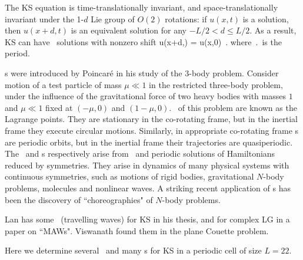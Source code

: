 \renewcommand{\inputfile}{\version\ - edited 2007-03-11 rpoHistory}


The KS equation   is time-translationally invariant,
and
space-translationally invariant
under the 1-$d$ Lie group of $O(2)$ rotations: if
$u(x,t)$ is a solution, then $u(x+d,t)$ is an equivalent
solution for any $-L/2 < d \leq L/2$.
As a result,
KS can have \rpo\ solutions with nonzero shift
\beq
u(x+d,\period{}) = u(x,0)
\,.
where $\period{}$ is the period.


{\Rpo s} were introduced by Poincar\'e in his study of
the 3-body problem.
Consider motion of a test particle of mass
$\mu \ll 1$ in the
restricted three-body problem,
under the
influence of the gravitational force of two heavy bodies with masses $1$ and
$\mu \ll 1$ fixed at $(-\mu,0)$ and $(1-\mu,0)$. \Reqva\ of this problem
are known as the Lagrange points. They are stationary in
the co-rotating frame, but
in the inertial frame they execute circular motions.
Similarly, in appropriate co-rotating frame
{\rpo s} are periodic orbits,
but in the inertial frame their trajectories
are quasiperiodic.
The \reqva\ and \rpo s
respectively arise from
\eqva\ and periodic solutions of Hamiltonians reduced by symmetries.
They arise in dynamics of many physical systems
with continuous symmetries, such as motions of rigid bodies, gravitational
$N$-body problems, molecules and nonlinear waves.
A striking recent application of \rpo s has been the discovery
of ``choreographies" of $N$-body problems.

Lan has some \reqva\ (travelling waves) for KS in his
thesis, %
 and for complex LG in a paper on ``MAWs".
Viswanath %
found them in the plane Couette problem.

Here we determine
several \eqva\ and many \rpo s for
KS in a periodic cell of size $L=22$.
